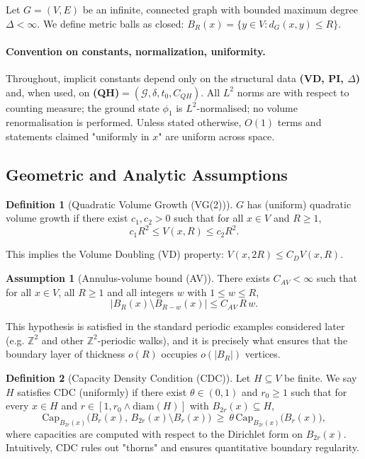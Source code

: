 \documentclass[reqno]{amsart}
\numberwithin{equation}{section}
\theoremstyle{definition}
\newtheorem{definition}[definition]{Definition}
\newtheorem{assumption}[assumption]{Assumption}
\theoremstyle{remark}
\newcommand{\cG}{\mathcal{G}}
\begin{document}
Let $G = (V,E)$ be an infinite, connected graph with bounded maximum degree $\Delta < \infty$. We define metric balls as closed: $B_R(x) = \{y \in V : d_G(x,y) \leq R\}$.

\paragraph{Convention on constants, normalization, uniformity.}
Throughout, implicit constants depend only on the structural data \textbf{(VD, PI, $\Delta$)} and, when used, on \textbf{(QH)}$=(\cG,\delta,t_0,C_{QH})$. All $L^2$ norms are with respect to counting measure; the ground state $\phi_1$ is $L^2$-normalised; no volume renormalisation is performed. Unless stated otherwise, $O(1)$ terms and statements claimed "uniformly in $x$" are uniform across space.

\subsection{Geometric and Analytic Assumptions}

\begin{definition}[Quadratic Volume Growth (VG(2))]
$G$ has (uniform) quadratic volume growth if there exist $c_1, c_2 > 0$ such that for all $x \in V$ and $R \geq 1$,
\begin{equation}\label{eq:quad}
c_1 R^{2} \leq V(x,R) \leq c_2 R^{2}.
\end{equation}
\end{definition}
This implies the Volume Doubling (VD) property: $V(x,2R) \leq C_D V(x,R)$.

\begin{assumption}[Annulus-volume bound (AV)]\label{ass:AV}
There exists $C_{AV}<\infty$ such that for all $x\in V$, all $R\ge 1$ and all integers $w$ with $1\le w\le R$,
\[
  |B_R(x)\setminus B_{R-w}(x)|\le C_{AV}\,R\,w.
\]
\end{assumption}
\noindent This hypothesis is satisfied in the standard periodic examples considered later (e.g. $\mathbb Z^2$ and other $\mathbb Z^2$-periodic walks), and it is precisely what ensures that the boundary layer of thickness $o(R)$ occupies $o(|B_R|)$ vertices.

\begin{definition}[Capacity Density Condition (CDC)]\label{def:CDC}
Let $H\subseteq V$ be finite. We say $H$ satisfies CDC (uniformly) if there exist $\theta\in(0,1)$ and $r_0\ge1$ such that for every $x\in H$ and $r\in[1,r_0\wedge \mathrm{diam}(H)]$ with $B_{2r}(x)\subseteq H$,
\[
  \mathrm{Cap}_{B_{2r}(x)}\big(B_{r}(x),\,B_{2r}(x)\setminus B_{r}(x)\big)\ \ge\ \theta\,\mathrm{Cap}_{B_{2r}(x)}\big(B_{r}(x)\big),
\]
where capacities are computed with respect to the Dirichlet form on $B_{2r}(x)$. Intuitively, CDC rules out "thorns" and ensures quantitative boundary regularity.
\end{definition}
\end{document}
